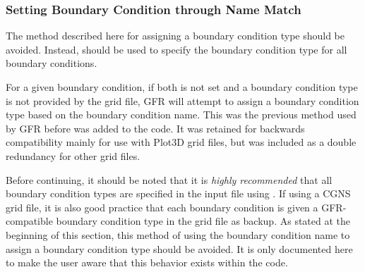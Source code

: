 \subsubsection{Setting Boundary Condition through Name Match}
\label{SEC:BC:NameMatch}

\NOTE The method described here for assigning a boundary condition type should
be avoided.
%
Instead,  should be used to
specify the boundary condition type for all boundary conditions.


For a given boundary condition, if both  is not set and
a boundary condition type is not provided by the grid file, GFR will attempt to
assign a boundary condition type based on the boundary condition name.
%
This was the previous method used by GFR before \BCinptext{} was added to the
code.
%
It was retained for backwards compatibility mainly for use with Plot3D grid
files, but was included as a double redundancy for other grid files.


Before continuing, it should be noted that it is \emph{highly recommended} that
all boundary condition types are specified in the input file using
.
%
If using a CGNS grid file, it is also good practice that each boundary condition
is given a GFR-compatible boundary condition type in the grid file as backup.
%
As stated at the beginning of this section, this method of using the boundary
condition name to assign a boundary condition type should be avoided.
%
It is only documented here to make the user aware that this behavior exists
within the code.


